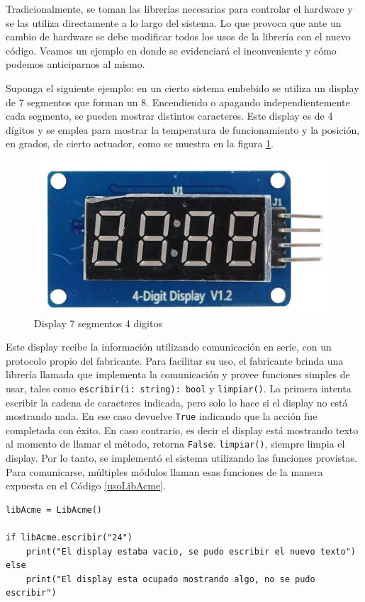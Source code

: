 Tradicionalmente, se toman las librerías necesarias para controlar el hardware y se las utiliza directamente a lo largo del sistema. Lo que provoca que ante un cambio de hardware se debe modificar todos los usos de la librería con el nuevo código. Veamos un ejemplo en donde se evidenciará el inconveniente y cómo podemos anticiparnos al mismo.

Suponga el siguiente ejemplo: en un cierto sistema embebido se utiliza un display de 7 segmentos que forman un 8. Encendiendo o apagando independientemente cada segmento, se pueden mostrar distintos caracteres. Este display es de 4 dígitos y se emplea para mostrar la temperatura de funcionamiento y la posición, en grados, de cierto actuador, como se muestra en la figura \ref{fig:enter-label}.

\begin{figure}[h]
    \centering
    \includegraphics[width=0.5\linewidth]{display.png}
    \caption{Display 7 segmentos 4 digitos}
    \label{fig:enter-label}
\end{figure}


Este display recibe la información utilizando comunicación en serie, con un protocolo propio del fabricante. Para facilitar su uso, el fabricante brinda una librería llamada \LibAcme que implementa la comunicación y provee funciones simples de usar, tales como \verb|escribir(i: string): bool| y \verb|limpiar()|. La primera intenta escribir la cadena de caracteres indicada, pero solo lo hace si el display no está mostrando nada. En ese caso devuelve \verb|True| indicando que la acción fue completada con éxito. En caso contrario, es decir el display está mostrando texto al momento de llamar el método, retorna \verb|False|. \verb|limpiar()|, siempre limpia el display. Por lo tanto, se implementó el sistema utilizando las funciones provistas. Para comunicarse, múltiples módulos llaman esas funciones de la manera expuesta en el Código \ref{usoLibAcme}.

\begin{lstlisting}[label={usoLibAcme}, caption=Ejemplo de uso de la libreria LibAcme.]
libAcme = LibAcme()

if libAcme.escribir("24")
	print("El display estaba vacio, se pudo escribir el nuevo texto")
else
	print("El display esta ocupado mostrando algo, no se pudo escribir")

\end{lstlisting}

